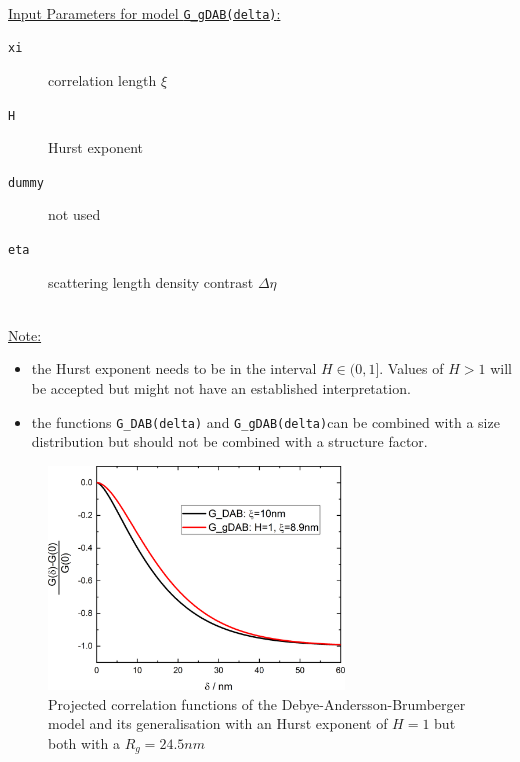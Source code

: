 \hspace{1pt}\\
\underline{Input Parameters for model \texttt{G\_gDAB(delta)}:}\\
\begin{description}
\item[\texttt{xi}] correlation length $\xi$
\item[\texttt{H}] Hurst exponent
\item[\texttt{dummy}] not used
\item[\texttt{eta}] scattering length density contrast $\Delta\eta$
\end{description}

\hspace{1pt}\\
\underline{Note:}
\begin{itemize}
\item the Hurst exponent needs to be in the interval $H \in (0,1]$. Values of $H>1$ will be accepted but might not have an established interpretation.
\item the functions \texttt{G\_DAB(delta)} and \texttt{G\_gDAB(delta)}can be combined with a size distribution but should not be combined with a structure factor.
\end{itemize}

\begin{figure}[htb]
\begin{center}
\includegraphics[width=0.7\textwidth]{../images/form_factor/SESANS/G_gDAB.png}
\end{center}
\caption{Projected correlation functions of the Debye-Andersson-Brumberger model and its generalisation with an Hurst exponent of $H=1$ but both with a $R_g=24.5nm$}
\label{fig:G_gDAB}
\end{figure}


